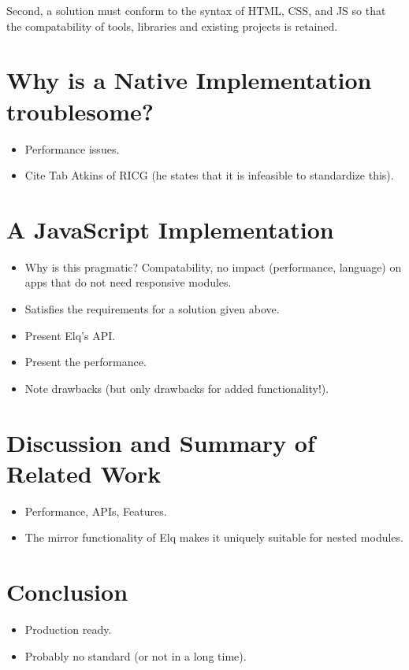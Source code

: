 \documentclass{sigchi}
\begin{document}
  Second, a solution must conform to the syntax of HTML, CSS, and JS so that the compatability of tools, libraries and existing projects is retained.

\section{Why is a Native Implementation troublesome?}
  \begin{itemize}
    \item Performance issues.
    \item Cite Tab Atkins of RICG (he states that it is infeasible to standardize this).
  \end{itemize}

\section{A JavaScript Implementation}
  \begin{itemize}
    \item Why is this pragmatic? Compatability, no impact (performance, language) on apps that do not need responsive modules.
    \item Satisfies the requirements for a solution given above.
    \item Present Elq's API.
    \item Present the performance.
    \item Note drawbacks (but only drawbacks for added functionality!).
  \end{itemize}

\section{Discussion and Summary of Related Work}
  \begin{itemize}
    \item Performance, APIs, Features.
    \item The mirror functionality of Elq makes it uniquely suitable for nested modules.
  \end{itemize}

\section{Conclusion}
  \begin{itemize}
    \item Production ready.
    \item Probably no standard (or not in a long time).
  \end{itemize}
\end{document}
